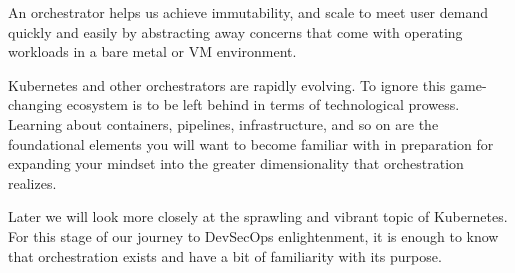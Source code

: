 \justifying
An orchestrator helps us achieve immutability, and scale to meet user demand quickly and easily by abstracting away
concerns that come with operating workloads in a bare metal or VM environment.

\justifying
Kubernetes and other orchestrators are rapidly evolving. To ignore this game-changing ecosystem is to be left behind in terms of technological prowess. Learning about containers, pipelines, infrastructure, and
so on are the foundational elements you will want to become familiar with in preparation for expanding your mindset into the greater
dimensionality that orchestration realizes.

\justifying
Later we will look more closely at the sprawling and vibrant topic of Kubernetes. For this stage of our journey to DevSecOps
enlightenment, it is enough to know that orchestration exists and have a bit of familiarity with its purpose.
